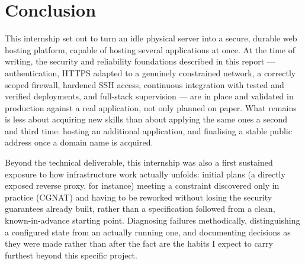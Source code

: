 \chapter*{Conclusion}

This internship set out to turn an idle physical server into a secure, durable web hosting platform, capable of hosting several applications at once. At the time of writing, the security and reliability foundations described in this report — authentication, HTTPS adapted to a genuinely constrained network, a correctly scoped firewall, hardened SSH access, continuous integration with tested and verified deployments, and full-stack supervision — are in place and validated in production against a real application, not only planned on paper. What remains is less about acquiring new skills than about applying the same ones a second and third time: hosting an additional application, and finalising a stable public address once a domain name is acquired.

Beyond the technical deliverable, this internship was also a first sustained exposure to how infrastructure work actually unfolds: initial plans (a directly exposed reverse proxy, for instance) meeting a constraint discovered only in practice (CGNAT) and having to be reworked without losing the security guarantees already built, rather than a specification followed from a clean, known-in-advance starting point. Diagnosing failures methodically, distinguishing a configured state from an actually running one, and documenting decisions as they were made rather than after the fact are the habits I expect to carry furthest beyond this specific project.

\clearpage

